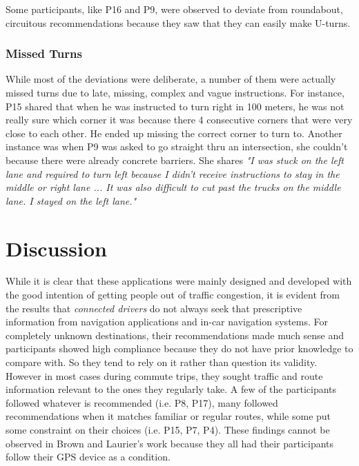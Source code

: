 Some participants, like P16 and P9, were observed to deviate from roundabout, circuitous recommendations because they saw that they can easily make U-turns. 

\subsubsection{Missed Turns}
While most of the deviations were deliberate, a number of them were actually missed turns due to late, missing, complex and vague instructions. For instance, P15 shared that when he was instructed to turn right in 100 meters, he was not really sure which corner it was because there 4 consecutive corners that were very close to each other. He ended up missing the correct corner to turn to.  Another instance was when P9 was asked to go straight thru an intersection, she couldn't because there were already concrete barriers. She shares \emph{"I was stuck on the left lane and required to turn left because I didn't receive instructions to stay in the middle or right lane ... It was also difficult to cut past the trucks on the middle lane. I stayed on the left lane."}

\section{Discussion}
While it is clear that these applications were mainly designed and developed with the good intention of getting people out of traffic congestion, it is evident from the results that \emph{connected drivers} do not always seek that prescriptive information from navigation applications and in-car navigation systems. For completely unknown destinations, their recommendations made much sense and participants showed high compliance because they do not have prior knowledge to compare with. So they tend to rely on it rather than question its validity. However in most cases during commute trips, they sought traffic and route information relevant to the ones they regularly take. A few of the participants followed whatever is recommended (i.e. P8, P17), many followed recommendations when it matches familiar or regular routes, while some put some constraint on their choices (i.e. P15, P7, P4). These findings cannot be observed in Brown and Laurier's \cite{Brown2012TheGPS} work because they all had their participants follow their GPS device as a condition.

